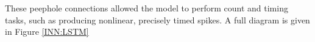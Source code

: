 These peephole connections allowed the model to perform count and timing tasks,
such as producing nonlinear, precisely timed spikes.
A full diagram is given in Figure \ref{INN:LSTM}

\newpage
{}\label{INN:LSTM}




